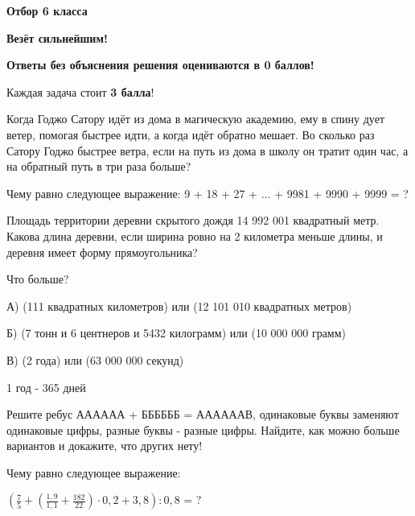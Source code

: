 \centerline{\bf \Huge Отбор 6 класса}

\begin{flushright}
        \scriptsize{\textbf{Везёт сильнейшим!}}
\end{flushright}
\textbf{Ответы без объяснения решения оцениваются в 0 баллов!}

Каждая задача стоит \textbf{3 балла}!

 Когда Годжо Сатору идёт из дома в магическую академию, ему в спину дует ветер, помогая быстрее идти, а когда идёт обратно мешает. Во сколько раз Сатору Годжо быстрее ветра, если на путь из дома в школу он тратит один час, а на обратный путь в три раза больше?

 Чему равно следующее выражение: 9 + 18 + 27 + ... + 9981 + 9990 + 9999 = ?

 Площадь территории деревни скрытого дождя 14 992 001 квадратный метр. Какова длина деревни, если ширина ровно на 2 километра меньше длины, и деревня имеет форму прямоугольника?

 Что больше?

А) (111 квадратных километров) или (12 101 010 квадратных метров)

Б) (7 тонн и 6 центнеров и 5432 килограмм) или (10 000 000 грамм)

В) (2 года) или (63 000 000 секунд)

1 год - 365 дней

 Решите ребус АААААА + ББББББ = ААААААВ, одинаковые буквы заменяют одинаковые цифры, разные буквы - разные цифры. Найдите, как можно больше вариантов и докажите, что других нету!

 Чему равно следующее выражение: 

$(\frac{7}{5} + (\frac{1,9}{1,1}+ \frac{182}{22})\cdot0,2 + 3,8):0,8$ = ?